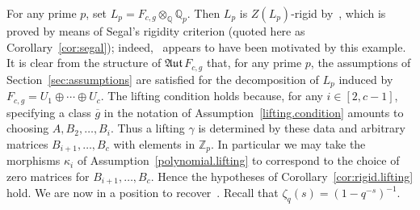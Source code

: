 \documentclass[11pt,a4paper]{amsart}
\theoremstyle{plain}
\theoremstyle{remark}
\newcommand{\Z}{\mathbb{Z}}
\newcommand{\Q}{\mathbb{Q}}
\newcommand{\tensor}{\otimes}
\def \aAut {\mathfrak{Aut} \,}
\begin{document}
For any prime $p$, set $L_p = F_{c,g} \tensor_\Q \Q_p$.  Then $L_p$ is $Z(L_p)$-rigid by~\cite[Theorem~1]{Segal/89}, which is proved by means of Segal's rigidity criterion (quoted here as Corollary~\ref{cor:segal}); indeed,~\cite{Segal/89} appears to have been motivated by this example.  
It is clear from the structure of $\aAut F_{c,g}$ that, for any prime $p$, the assumptions of Section~\ref{sec:assumptions} are satisfied for the decomposition of $L_p$ induced by $F_{c,g} = U_1 \oplus  \cdots \oplus U_c$.  The lifting condition holds because, for any $i \in [2,c-1]$, specifying a class $\overline{g}$ in the notation of Assumption~\ref{lifting.condition} amounts to choosing $A, B_2, \dots, B_i$.  Thus a lifting $\gamma$ is determined by these data and arbitrary matrices $B_{i+1}, \dots, B_c$ with elements in $\Z_p$.  In particular we may take the morphisms $\kappa_i$ of Assumption~\ref{polynomial.lifting} to correspond to the choice of zero matrices for $B_{i+1}, \dots, B_c$.  Hence the hypotheses of Corollary~\ref{cor:rigid.lifting} hold.
We are now in a position to recover~\cite[Theorem~7.1]{GSS/88}.  Recall that $\zeta_q(s) = (1 - q^{-s})^{-1}$.
\end{document}
